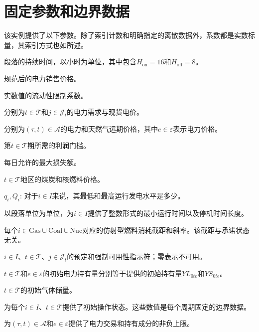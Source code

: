 \documentclass[11pt,a4paper]{article}
\begin{document}
\section*{固定参数和边界数据}
该实例提供了以下参数。除了索引计数和明确指定的离散数据外，系数都是实数标量，其索引方式也如所述。
\begin{description}
\item[$H_e$:] 段落的持续时间，以小时为单位，其中包含$H_{\mathrm{on}}=16$和$H_{\mathrm{off}}=8$。
\item[$P$:] 规范后的电力销售价格。
\item[$\alpha$:] 实数值的流动性限制系数。
\item[$D_{tj},PS_{tj}$:] 分别为$t\in\mathcal T$和$j\in\mathcal J_t$的电力需求与现货电价。
\item[$PP_{\tau te},PG_{\tau t}$:] 分别为$(\tau,t)\in\mathcal A$的电力和天然气远期价格，其中$e\in\varepsilon$表示电力价格。
\item[$PT_t$:] 第$t\in\mathcal T$期所需的利润门槛。
\item[$ML$:] 每日允许的最大损失额。
\item[$CP_t,NP_t$:] $t\in\mathcal T$地区的煤炭和核燃料价格。
\item$q_i,Q_i$: 对于$i\in I$来说，其最低和最高运行发电水平是多少。
\item[$L_i,l_i$:] 以段落单位为单位，为$i\in I$提供了整数形式的最小运行时间以及停机时间长度。
\item[$a_i,b_i$:] 每个$i\in\mathrm{Gas}\cup\mathrm{Coal}\cup\mathrm{Nuc}$对应的仿射型燃料消耗截距和斜率。该截距与承诺状态无关。
\item[$W_{itj},\varpi_{itj}\in\{0,1\}$:] $i\in I$、$t\in\mathcal T$、$j\in\mathcal J_t$的预定和强制可用性指示符；零表示不可用。
\item[$YP_{0te}^{+},YP_{0te}^{-}\ge0$:] $t\in\mathcal T$和$e\in\varepsilon$的初始电力持有量分别等于提供的初始持有量$YL_{0te}$和$YS_{0te}$。
\item[$YG_{0t}\ge0$:] $t\in\mathcal T$的初始气体储量。
\item[$U_{it0}\in\{0,1\}$:] 为每个$i\in I$、$t\in\mathcal T$提供了初始操作状态。这些数值是每个周期固定的边界数据。
\item[$\overline{FP}_{\tau te}^{+},\overline{FP}_{\tau te}^{-},\overline{YP}_{\tau te}^{+},\overline{YP}_{\tau te}^{-}$:] 为$(\tau,t)\in\mathcal A$和$e\in\varepsilon$提供了电力交易和持有成分的非负上限。 
\end{description}
\end{document}
